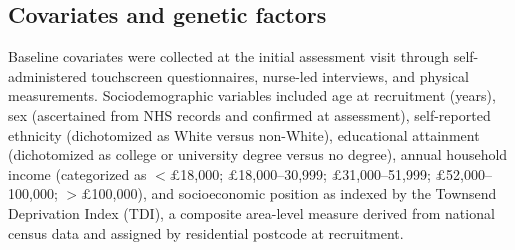 \documentclass{article}
\begin{document}
\subsection*{Covariates and genetic factors}

Baseline covariates were collected at the initial assessment visit through self-administered touchscreen questionnaires, nurse-led interviews, and physical measurements. Sociodemographic variables included age at recruitment (years), sex (ascertained from NHS records and confirmed at assessment), self-reported ethnicity (dichotomized as White versus non-White), educational attainment (dichotomized as college or university degree versus no degree), annual household income (categorized as $<\pounds$18,000; $\pounds$18,000--30,999; $\pounds$31,000--51,999; $\pounds$52,000--100,000; $>\pounds$100,000), and socioeconomic position as indexed by the Townsend Deprivation Index (TDI), a composite area-level measure derived from national census data and assigned by residential postcode at recruitment.
\end{document}
